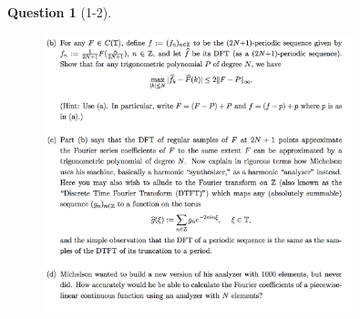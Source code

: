 \documentclass{article} %
\theoremstyle{quest}
\newtheorem*{question}{Question}
\begin{document}
\begin{question}[1-2]
\hfill
\begin{figure}[h!]
  \centering
    \includegraphics[width=0.8\textwidth]{HA-f-1-2.png}
\end{figure}
\end{question}
\end{document}
